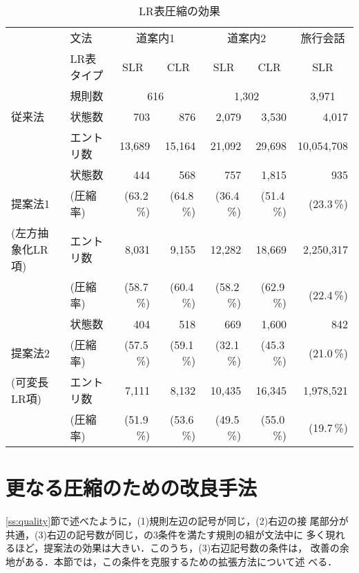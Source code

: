 \begin{table}
\caption{LR表圧縮の効果}
\label{tbl:state}
\begin{center}
\begin{tabular}{|l|l|r|r|r|r|r|}
\hline
 & 文法 & \multicolumn{2}{c|}{道案内1} & \multicolumn{2}{c|}{道案内2} & \multicolumn{1}{c|}{旅行会話}\\
\cline{2-7}
 & LR表タイプ & \multicolumn{1}{c|}{SLR} & \multicolumn{1}{c|}{CLR} & \multicolumn{1}{c|}{SLR} & \multicolumn{1}{c|}{CLR} & \multicolumn{1}{c|}{SLR}\\
\cline{2-7}
 & 規則数 & \multicolumn{2}{c|}{616} & \multicolumn{2}{c|}{1,302} & \multicolumn{1}{c|}{3,971} \\
\hline
従来法 & 状態数 & 703 & 876 & 2,079 & 3,530 & 4,017\\
 & エントリ数 & 13,689 & 15,164 & 21,092 & 29,698 & 10,054,708\\
\hline
 & 状態数 & 444 & 568 & 757 & 1,815 & 935\\
 提案法1 & (圧縮率) & (63.2\,\%) & (64.8\,\%) & (36.4\,\%) & (51.4\,\%) & (23.3\,\%)\\
 (左方抽象化LR項) & エントリ数 & 8,031 & 9,155 & 12,282 & 18,669 & 2,250,317\\
 & (圧縮率) & (58.7\,\%) & (60.4\,\%) & (58.2\,\%) & (62.9\,\%) & (22.4\,\%)\\
\hline
 & 状態数 & 404 & 518 & 669 & 1,600 & 842\\
 提案法2 & (圧縮率) & (57.5\,\%) & (59.1\,\%) & (32.1\,\%) & (45.3\,\%) & (21.0\,\%)\\
 (可変長LR項) & エントリ数 & 7,111 & 8,132 & 10,435 & 16,345 & 1,978,521\\
 & (圧縮率) & (51.9\,\%) & (53.6\,\%) & (49.5\,\%) & (55.0\,\%) & (19.7\,\%)\\
\hline
\end{tabular}
\end{center}
\end{table}

\section{更なる圧縮のための改良手法}
\label{ss:extension}

\ref{ss:quality}節で述べたように，(1)規則左辺の記号が同じ，(2)右辺の接
尾部分が共通，(3)右辺の記号数が同じ，の3条件を満たす規則の組が文法中に
多く現れるほど，提案法の効果は大きい．このうち，(3)右辺記号数の条件は，
改善の余地がある．本節では，この条件を克服するための拡張方法について述
べる．


